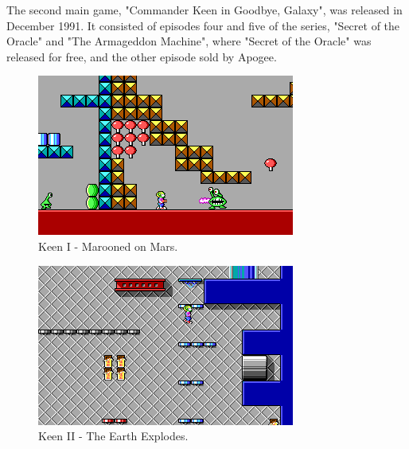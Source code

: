 \documentclass[book.tex]{subfiles}
\begin{document}
\par
The second main game, "Commander Keen in Goodbye, Galaxy", was released in December 1991. It consisted of episodes four and five of the series, "Secret of the Oracle" and "The Armageddon Machine", where "Secret of the Oracle" was released for free, and the other episode sold by Apogee.\\

\begin{figure}[H]
  \centering
  \includegraphics[width=.95\textwidth]{screenshots_300dpi/Keen_Marooned_on_Mars_gameplay.png}
  \caption{Keen I - Marooned on Mars.}
\label{fig:keen_1}
\end{figure}

\begin{figure}[H]
  \centering
  \includegraphics[width=.95\textwidth]{screenshots_300dpi/keen1_2.png}
  \caption{Keen II - The Earth Explodes.}
\label{fig:keen_1}
\end{figure}
\end{document}
